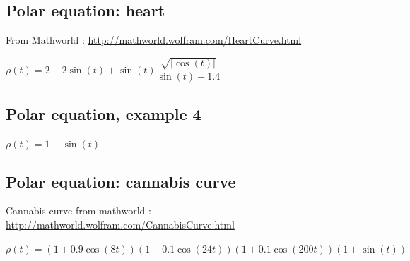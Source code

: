 \newpage
\subsection{Polar equation: heart}
From Mathworld :  \url{http://mathworld.wolfram.com/HeartCurve.html}

 $\rho(t)= 2-2\sin(t)+\sin(t)\dfrac{\sqrt{\lvert\cos(t)\rvert}}{\sin(t)+1.4}$

\begin{center}
\begin{tkzexample}[]
\end{tkzexample}
\end{center}

\subsection{Polar equation, example 4}
 $\rho(t)= 1-\sin(t)$

\begin{center}
\begin{tkzexample}[]
\end{tkzexample}
\end{center}

\newpage
\subsection{Polar equation: cannabis curve}
 Cannabis curve from mathworld : \url{http://mathworld.wolfram.com/CannabisCurve.html}

$ \rho(t)=(1+0.9\cos(8t))(1+0.1\cos(24t))(1+0.1\cos(200t))(1+\sin(t)) $

\begin{center}
\begin{tkzexample}[vbox]
\end{tkzexample}
\end{center}

